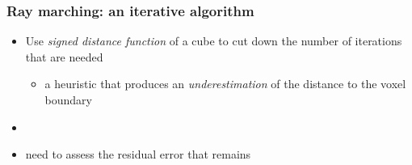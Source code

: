 \documentclass{beamer}
\begin{document}
\begin{frame}
\begin{figure}
  \end{figure}
\end{frame}

\begin{frame}
  \frametitle{Ray marching: an iterative algorithm}
  \begin{itemize}
    \item Use \textsl{signed distance function} of a cube to cut down the number of iterations that are needed
      \begin{itemize}
        \item a heuristic that produces an \textsl{underestimation} of the distance to the voxel boundary
      \end{itemize}
      \item
      \item need to assess the residual error that remains
  \end{itemize}
\end{frame}
\end{document}
